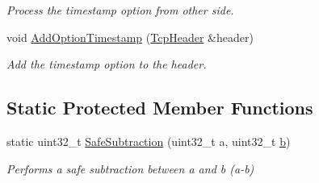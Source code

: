 \begin{DoxyCompactItemize}
\begin{DoxyCompactList}\small\item\em Process the timestamp option from other side. \end{DoxyCompactList}\item 
void \hyperlink{classns3_1_1TcpSocketBase_a62689196f68584e8731fb5c6b7693d30}{Add\+Option\+Timestamp} (\hyperlink{classns3_1_1TcpHeader}{Tcp\+Header} \&header)
\begin{DoxyCompactList}\small\item\em Add the timestamp option to the header. \end{DoxyCompactList}\end{DoxyCompactItemize}
\subsection*{Static Protected Member Functions}
\begin{DoxyCompactItemize}
\item 
static uint32\+\_\+t \hyperlink{classns3_1_1TcpSocketBase_a7925b2818a17c63669a64488ce2726d0}{Safe\+Subtraction} (uint32\+\_\+t a, uint32\+\_\+t \hyperlink{lte__pathloss_8m_a21ad0bd836b90d08f4cf640b4c298e7c}{b})
\begin{DoxyCompactList}\small\item\em Performs a safe subtraction between a and b (a-\/b) \end{DoxyCompactList}\end{DoxyCompactItemize}
